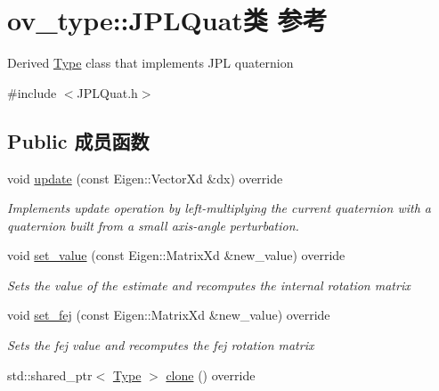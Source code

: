 \hypertarget{classov__type_1_1JPLQuat}{}\section{ov\+\_\+type\+:\+:J\+P\+L\+Quat类 参考}
\label{classov__type_1_1JPLQuat}


Derived \hyperlink{classov__type_1_1Type}{Type} class that implements J\+PL quaternion  




{\ttfamily \#include $<$J\+P\+L\+Quat.\+h$>$}

\subsection*{Public 成员函数}
\begin{DoxyCompactItemize}
\item 
void \hyperlink{classov__type_1_1JPLQuat_af0a26f1b03bc7c89abad5dfd985c61cd}{update} (const Eigen\+::\+Vector\+Xd \&dx) override
\begin{DoxyCompactList}\small\item\em Implements update operation by left-\/multiplying the current quaternion with a quaternion built from a small axis-\/angle perturbation. \end{DoxyCompactList}\item 
void \hyperlink{classov__type_1_1JPLQuat_a51847b09cfc48c3d869d08ecd7f4821d}{set\+\_\+value} (const Eigen\+::\+Matrix\+Xd \&new\+\_\+value) override
\begin{DoxyCompactList}\small\item\em Sets the value of the estimate and recomputes the internal rotation matrix \end{DoxyCompactList}\item 
void \hyperlink{classov__type_1_1JPLQuat_ae631d6cf4ed4170234272be498fd22e3}{set\+\_\+fej} (const Eigen\+::\+Matrix\+Xd \&new\+\_\+value) override
\begin{DoxyCompactList}\small\item\em Sets the fej value and recomputes the fej rotation matrix \end{DoxyCompactList}\item 
\mbox{\label{classov__type_1_1JPLQuat_a1a85597f2096605d2ddbee7c449bf4bc}} 
std\+::shared\+\_\+ptr$<$ \hyperlink{classov__type_1_1Type}{Type} $>$ \hyperlink{classov__type_1_1JPLQuat_a1a85597f2096605d2ddbee7c449bf4bc}{clone} () override

\end{DoxyCompactItemize}
